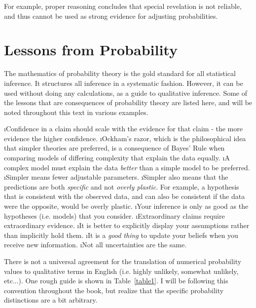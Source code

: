 For example, proper reasoning concludes that special revelation is not reliable, and thus cannot be used as strong evidence for adjusting probabilities.



\section{Lessons from Probability}
The mathematics of probability theory is the gold standard for all statistical inference.  It structures all inference in a systematic fashion.  However, it can be used without doing any calculations, as a guide to qualitative inference.  Some of the lessons that are consequences of probability theory are listed here, and will be noted throughout this text in various examples.

\bi
\i Confidence in a claim should scale with the evidence for that claim - the more evidence the higher confidence.
\i Ockham's razor, which is the philosophical idea that simpler theories are preferred, is a consequence of Bayes' Rule when comparing models of differing complexity that explain the data equally.
\i A complex model must explain the data \emph{better} than a simple model to be preferred.
\i Simpler means fewer adjustable parameters.
\i Simpler also means that the predictions are both {\em specific} and not {\em overly plastic}. For example, a hypothesis that is consistent with the observed data, and can also be consistent if the data were the opposite, would be overly plastic.
\i Your inference is only as good as the hypotheses (i.e. models) that you consider.
\i Extraordinary claims require extraordinary evidence.\cite{sagandemon}
\i It is better to explicitly display your assumptions rather than implicitly hold them.
\i It is a {\em good thing} to update your beliefs when you receive new information.
\i Not all uncertainties are the same.
\ei


There is not a universal agreement for the translation of numerical probability values to qualitative terms in English (i.e. highly unlikely, somewhat unlikely, etc...).  One rough guide is shown in Table~\ref{table1}.  I will be following this convention throughout the book, but realize that the specific probability distinctions are a bit arbitrary.


